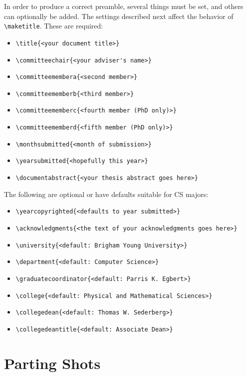 \documentclass[letterpaper,phd,prettyheadings,chaptercenter,parttop]{byumsphd}
\begin{document}
In order to produce a correct preamble, several things must be set, and others can optionally be added.  The settings described next affect the behavior of \verb|\maketitle|.  These are required:
\begin{itemize}
    \item \verb|\title{<your document title>}|
    \item \verb|\committeechair{<your adviser's name>}|
    \item \verb|\committeemembera{<second member>}|
    \item \verb|\committeememberb{<third member>}|
    \item \verb|\committeememberc{<fourth member (PhD only)>}|
    \item \verb|\committeememberd{<fifth member (PhD only)>}|
    \item \verb|\monthsubmitted{<month of submission>}|
    \item \verb|\yearsubmitted{<hopefully this year>}|
    \item \verb|\documentabstract{<your thesis abstract goes here>}|
\end{itemize}
The following are optional or have defaults suitable for CS majors:
\begin{itemize}
    \item \verb|\yearcopyrighted{<defaults to year submitted>}|
    \item \verb|\acknowledgments{<the text of your acknowledgments goes here>}|
    \item \verb|\university{<default: Brigham Young University>}|
    \item \verb|\department{<default: Computer Science>}|
    \item \verb|\graduatecoordinator{<default: Parris K. Egbert>}|
    \item \verb|\college{<default: Physical and Mathematical Sciences>}|
    \item \verb|\collegedean{<default: Thomas W. Sederberg>}|
    \item \verb|\collegedeantitle{<default: Associate Dean>}|
\end{itemize}

\chapter{Parting Shots}
\end{document}
